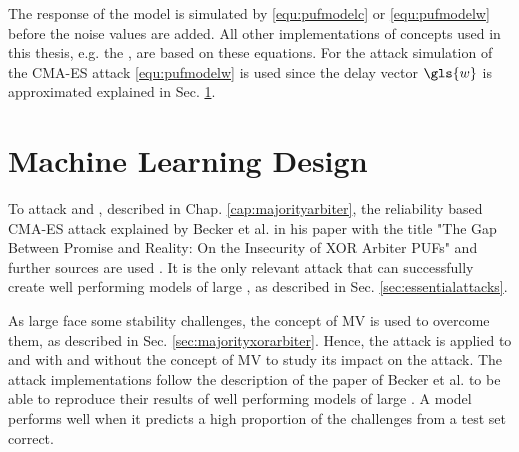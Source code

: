 The response of the \apuf model is simulated by \ref{equ:pufmodelc} or \ref{equ:pufmodelw} before the noise values are added.
All other implementations of \puf concepts used in this thesis, e.g. the \mpuf, are based on these \apuf equations.
For the attack simulation of the \ac{CMA-ES} attack \ref{equ:pufmodelw} is used since the delay vector $\gls{w}$ is approximated explained in Sec. \ref{sec:machinelearningdesign}.


\section{Machine Learning Design}
\label{sec:machinelearningdesign}

To attack \mpufs and \mxpufs, described in Chap. \ref{cap:majorityarbiter}, the reliability based \ac{CMA-ES} attack explained by Becker et al. in his paper with the title "The Gap Between Promise and Reality: On the Insecurity of XOR Arbiter PUFs" and further sources are used \cite{Becker2015ThePUFs,2017CMA-ES,Hansen2011TheTutorial,Hansen2006TheReview}. %
It is the only relevant attack that can successfully create well performing models of large \xpufs, as described in Sec. \ref{sec:essentialattacks}.

As large \xpufs face some stability challenges, the concept of \ac{MV} is used to overcome them, as described in Sec. \ref{sec:majorityxorarbiter}.
Hence, the attack is applied to \apufs and \xpufs with and without the concept of \ac{MV} to study its impact on the attack. %
The attack implementations follow the description of the paper of Becker et al. to be able to reproduce their results of well performing models of large \xpufs \cite{Becker2015ThePUFs}.
A model performs well when it predicts a high proportion of the challenges from a test set correct.

